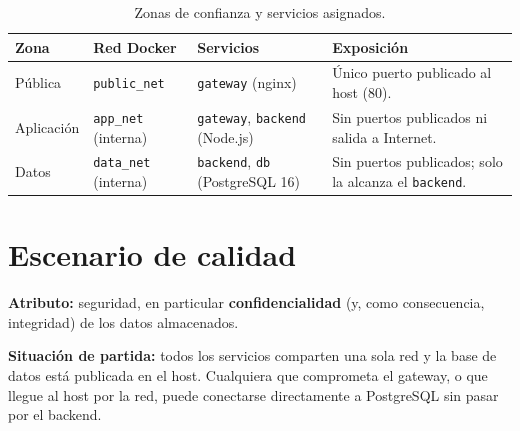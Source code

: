 \documentclass[11pt,letterpaper]{article}
\newcommand{\code}[1]{\texttt{#1}}
\begin{document}
\begin{table}[H]
\centering
\small
\begin{tabularx}{\textwidth}{l l l Y}
\toprule
{}
\textbf{Zona} & \textbf{Red Docker} & \textbf{Servicios} & \textbf{Exposición} \\
\midrule
Pública     & \code{public\_net}            & \code{gateway} (nginx)            & Único puerto publicado al host (80). \\
Aplicación  & \code{app\_net} (interna)     & \code{gateway}, \code{backend} (Node.js) & Sin puertos publicados ni salida a Internet. \\
Datos       & \code{data\_net} (interna)    & \code{backend}, \code{db} (PostgreSQL 16) & Sin puertos publicados; solo la alcanza el \code{backend}. \\
\bottomrule
\end{tabularx}
\caption{Zonas de confianza y servicios asignados.}
\end{table}

\section{Escenario de calidad}

\textbf{Atributo:} seguridad, en particular \textbf{confidencialidad} (y, como
consecuencia, integridad) de los datos almacenados.

\textbf{Situación de partida:} todos los servicios comparten una sola red y la base
de datos está publicada en el host. Cualquiera que comprometa el gateway, o que
llegue al host por la red, puede conectarse directamente a PostgreSQL sin pasar
por el backend.
\end{document}
